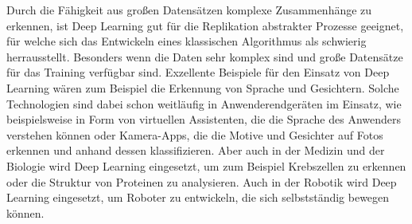 \newpage

\noindent Durch die Fähigkeit aus großen Datensätzen komplexe Zusammenhänge zu erkennen, ist Deep Learning gut für die Replikation abstrakter Prozesse geeignet, für welche sich das Entwickeln eines klassischen Algorithmus als schwierig herrausstellt. Besonders wenn die Daten sehr komplex sind und große Datensätze für das Training verfügbar sind. Exzellente Beispiele für den Einsatz von Deep Learning wären zum Beispiel die Erkennung von Sprache und Gesichtern. Solche Technologien sind dabei schon weitläufig in Anwenderendgeräten im Einsatz, wie beispielsweise in Form von virtuellen Assistenten, die die Sprache des Anwenders verstehen können oder Kamera-Apps, die die Motive und Gesichter auf Fotos erkennen und anhand dessen klassifizieren. Aber auch in der Medizin und der Biologie wird Deep Learning eingesetzt, um zum Beispiel Krebszellen zu erkennen oder die Struktur von Proteinen zu analysieren. Auch in der Robotik wird Deep Learning eingesetzt, um Roboter zu entwickeln, die sich selbstständig bewegen können. \\




